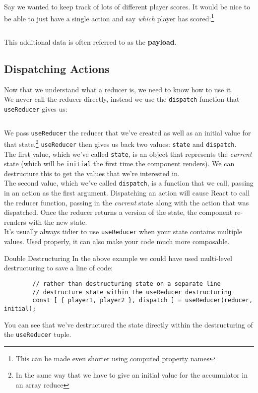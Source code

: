 Say we wanted to keep track of lots of different player scores. It would be nice to be able to just have a single action and say \textit{which} player has scored:\footnote{This can be made even shorter using \href{https://tylermcginnis.com/computed-property-names/}{computed property names}}

\inputminted{js}{04-hooks/figures/07-reducer-payload.js}

This additional data is often referred to as the \textbf{payload}.


\subsection{Dispatching Actions}

Now that we understand what a reducer is, we need to know how to use it.
\\

We never call the reducer directly, instead we use the \texttt{dispatch} function that \texttt{useReducer} gives us:

\inputminted{js}{04-hooks/figures/08-useReducer.js}

We pass \texttt{useReducer} the reducer that we've created as well as an initial value for that state.\footnote{In the same way that we have to give an initial value for the accumulator in an array reduce} \texttt{useReducer} then gives us back two values: \texttt{state} and \texttt{dispatch}.
\\

The first value, which we've called \texttt{state}, is an object that represents the \textit{current} state (which will be \texttt{initial} the first time the component renders). We can destructure this to get the values that we're interested in.
\\

The second value, which we've called \texttt{dispatch}, is a function that we call, passing in an action as the first argument. Dispatching an action will cause React to call the reducer function, passing in the \textit{current} state along with the action that was dispatched. Once the reducer returns a version of the state, the component re-renders with the new state.
\\

It's usually always tidier to use \texttt{useReducer} when your state contains multiple values. Used properly, it can also make your code much more composable.

\begin{infobox}{Double Destructuring}
    In the above example we could have used multi-level destructuring to save a line of code:

    \begin{verbatim}
        // rather than destructuring state on a separate line
        // destructure state within the useReducer destructuring
        const [ { player1, player2 }, dispatch ] = useReducer(reducer, initial);
    \end{verbatim}

    You can see that we've destructured the state directly within the destructuring of the \texttt{useReducer} tuple.
\end{infobox}


